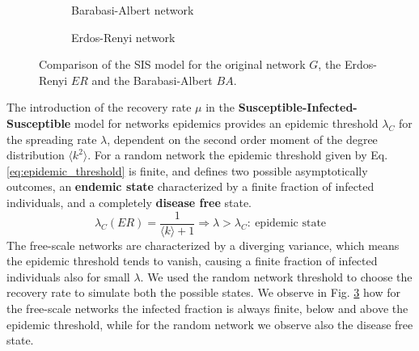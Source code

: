 \begin{figure}[H]
\begin{subfigure}{0.3\textwidth}
{            }
            \caption{Barabasi-Albert network}
            \label{diff_sis_er}
        \end{subfigure}
        \begin{subfigure}{0.3\textwidth}
            \caption{Erdos-Renyi network}
            \label{diff_sis_ba}
        \end{subfigure}
        \caption{Comparison of the SIS model for the original network $G$, the Erdos-Renyi $ER$ and the Barabasi-Albert $BA$.}
        \label{fig:diff_sis_comparison}
      \end{figure}

      The introduction of the recovery rate $\mu$ in the \textbf{Susceptible-Infected-Susceptible} model for networks epidemics
      provides an epidemic threshold $\lambda_C$ for the spreading rate $\lambda$, dependent on the second order moment of the degree
      distribution $\langle k^2 \rangle$.
      For a random network the epidemic threshold given by Eq. \ref{eq:epidemic_threshold} is finite, and defines two possible asymptotically outcomes, an \textbf{endemic state} characterized by a finite fraction of infected individuals, and a completely \textbf{disease free} state.
      \begin{equation}
        \lambda_C(ER) = \frac{1}{\langle k \rangle +1 } \Rightarrow \lambda>\lambda_C:\: \text{epidemic state}
        \label{eq:epidemic_threshold}
      \end{equation}
      The free-scale networks are characterized by a diverging variance, which means the epidemic threshold tends to vanish, causing a finite fraction of infected individuals also for small $\lambda$. 
      We used the random network threshold to choose the recovery rate to simulate both the possible states. We observe in Fig. \ref{fig:diff_sis_comparison} how for the free-scale networks the infected fraction is always finite, below and above the epidemic threshold, while for the random network we observe also the disease free state.
      
